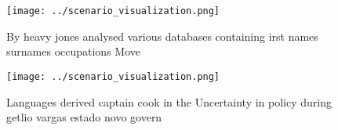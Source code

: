 \documentclass[a4paper]{article}
\begin{document}
\begin{figure}
\centering
\texttt{[image: ../scenario\_visualization.png]}
\caption{By heavy jones analysed various databases containing irst names surnames occupations Move
}
\end{figure}
 
\begin{figure}
\centering
\texttt{[image: ../scenario\_visualization.png]}
\caption{Languages derived captain cook in the Uncertainty in policy during getlio vargas estado novo govern
}
\end{figure}
 
\end{document}
